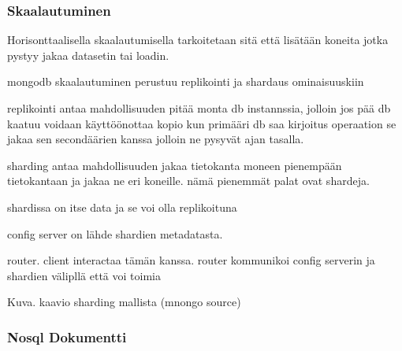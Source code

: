 \subsubsection{Skaalautuminen}



Horisonttaalisella skaalautumisella tarkoitetaan sitä että lisätään koneita jotka pystyy jakaa datasetin tai loadin.
\medskip

mongodb skaalautuminen perustuu replikointi ja shardaus ominaisuuskiin
\medskip



replikointi antaa mahdollisuuden pitää monta db instannssia, jolloin jos pää db kaatuu voidaan käyttöönottaa kopio
kun primääri db saa kirjoitus operaation se jakaa sen secondäärien kanssa jolloin ne pysyvät ajan tasalla.
\medskip





sharding antaa mahdollisuuden jakaa tietokanta moneen pienempään tietokantaan ja jakaa ne eri koneille. nämä pienemmät palat ovat shardeja.
\medskip


shardissa on itse data ja se voi olla replikoituna

config server on lähde shardien metadatasta.

router. client interactaa tämän kanssa. router kommunikoi config serverin ja shardien välipllä että voi toimia
\bigskip







Kuva\getImgCount{}. kaavio sharding mallista (mnongo source)
\medskip



\subsubsection{Nosql Dokumentti}

